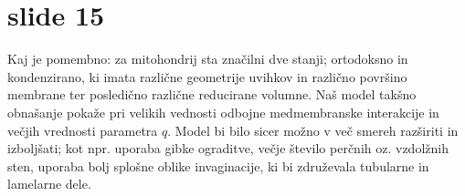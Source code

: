 \documentclass[openany, longbibliography,slovene,a4paper,12pt]{book}
\begin{document}
\section{slide 15}
Kaj je pomembno: za mitohondrij sta značilni dve stanji; ortodoksno in kondenzirano, ki imata različne geometrije uvihkov in različno površino membrane ter posledično različne reducirane volumne. Naš model takšno obnašanje pokaže pri velikih vednosti odbojne medmembranske interakcije in večjih vrednosti parametra $q$. Model bi bilo sicer možno v več smereh razširiti in izboljšati; kot npr. uporaba gibke ograditve, večje število perčnih oz. vzdolžnih sten, uporaba bolj splošne oblike invaginacije, ki bi združevala tubularne in lamelarne dele.
	
\end{document}
